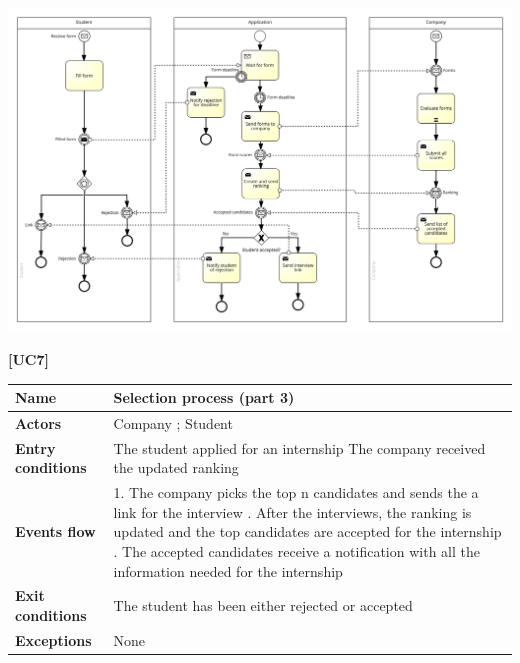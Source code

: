 \documentclass[11pt,twoside]{article}
\begin{document}
\begin{center}
\includegraphics[width=\textwidth]{Images/UC6}
\end{center}

\newpage

\large{\textbf{[UC7]}}
\begin{table}[H]
\begin{tabular}{| p{} | p{} |}
\hline
\textbf{Name}
& Selection process (part 3) \\
\hline
\textbf{Actors}
& Company ; Student \\
\hline
\textbf{Entry conditions}
& The student applied for an internship \newline
The company received the updated ranking \\
\hline
\textbf{Events flow}
& 1. The company picks the top n candidates and sends the a link for the interview \newline
2. After the interviews, the ranking is updated and the top candidates are accepted for the internship \newline
3. The accepted candidates receive a notification with all the information needed for the internship \\
\hline
\textbf{Exit conditions}
& The student has been either rejected or accepted \\
\hline
\textbf{Exceptions}
& None \\
\hline
\end{tabular}
\end{table}
\end{document}
